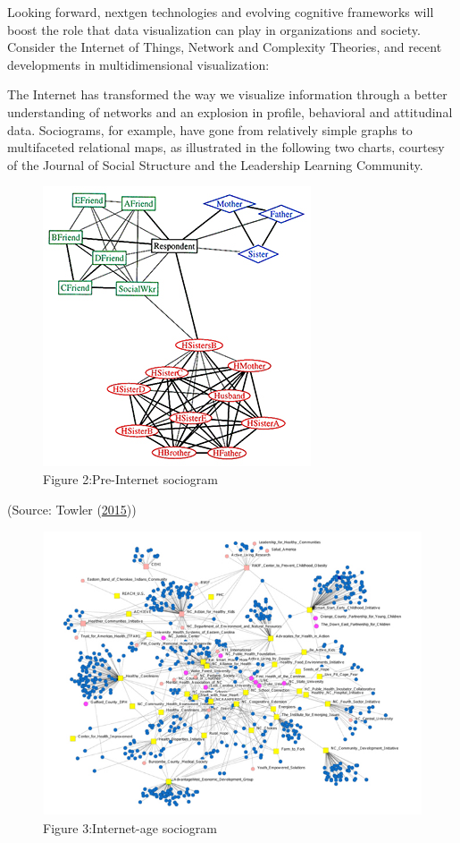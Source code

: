 \documentclass[]{book}
\begin{document}
Looking forward, nextgen technologies and evolving cognitive frameworks
will boost the role that data visualization can play in organizations
and society. Consider the Internet of Things, Network and Complexity
Theories, and recent developments in multidimensional visualization:

The Internet has transformed the way we visualize information through a
better understanding of networks and an explosion in profile, behavioral
and attitudinal data. Sociograms, for example, have gone from relatively
simple graphs to multifaceted relational maps, as illustrated in the
following two charts, courtesy of the Journal of Social Structure and
the Leadership Learning Community.

\begin{figure}
\centering
\includegraphics{images/Pre-internet.jpg}
\caption{Figure 2:Pre-Internet sociogram}
\end{figure}

(Source: Towler (\protect\hyperlink{ref-future_viz}{2015}))

\begin{figure}
\centering
\includegraphics{images/InternetAge.jpg}
\caption{Figure 3:Internet-age sociogram}
\end{figure}
\end{document}
